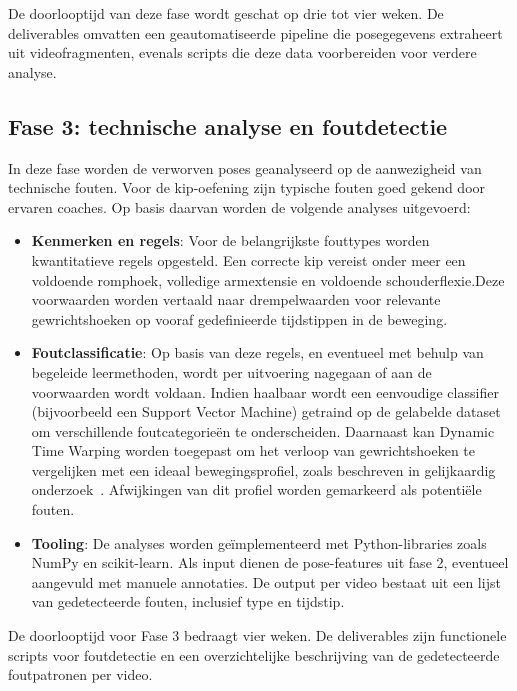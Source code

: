 De doorlooptijd van deze fase wordt geschat op drie tot vier weken. De deliverables omvatten een geautomatiseerde pipeline die posegegevens extraheert uit videofragmenten, evenals scripts die deze data voorbereiden voor verdere analyse.

\subsection{Fase 3: technische analyse en foutdetectie}

In deze fase worden de verworven poses geanalyseerd op de aanwezigheid van technische fouten. Voor de kip-oefening zijn typische fouten goed gekend door ervaren coaches. Op basis daarvan worden de volgende analyses uitgevoerd:

\begin{itemize}
    \item \textbf{Kenmerken en regels}: Voor de belangrijkste fouttypes worden kwantitatieve regels opgesteld. Een correcte kip vereist onder meer een voldoende romphoek, volledige armextensie en voldoende schouderflexie.\newline Deze voorwaarden worden vertaald naar drempelwaarden voor relevante gewrichtshoeken op vooraf gedefinieerde tijdstippen in de beweging.
    \item  \textbf{Foutclassificatie}: Op basis van deze regels, en eventueel met behulp van begeleide leermethoden, wordt per uitvoering nagegaan of aan de voorwaarden wordt voldaan. Indien haalbaar wordt een eenvoudige classifier (bijvoorbeeld een Support Vector Machine) getraind op de gelabelde dataset om verschillende foutcategorieën te onderscheiden. Daarnaast kan Dynamic Time Warping worden toegepast om het verloop van gewrichtshoeken te vergelijken met een ideaal bewegingsprofiel, zoals beschreven in gelijkaardig onderzoek~\autocite{Lyu2025}. Afwijkingen van dit profiel worden gemarkeerd als potentiële fouten.
    \item \textbf{Tooling}: De analyses worden geïmplementeerd met Python-libraries zoals NumPy en scikit-learn. Als input dienen de pose-features uit fase 2, eventueel aangevuld met manuele annotaties. De output per video bestaat uit een lijst van gedetecteerde fouten, inclusief type en tijdstip.
\end{itemize}

De doorlooptijd voor Fase 3 bedraagt vier weken. De deliverables zijn functionele scripts voor foutdetectie en een overzichtelijke beschrijving van de gedetecteerde foutpatronen per video.

